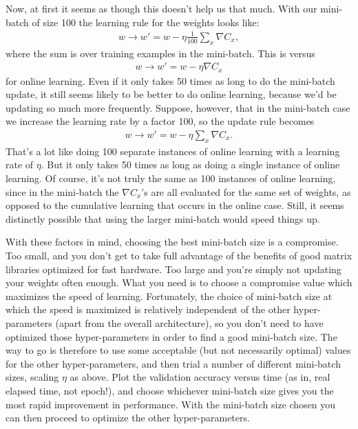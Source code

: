 \documentclass[a4paper,twoside,10pt]{book}
\begin{document}
Now, at first it seems as though this doesn't help us that much. With our mini-batch of size 100 the learning rule for the weights looks like:
\begin{eqnarray}
w \to w' = w-\eta \frac{1}{100} \sum_x \nabla C_x,
\label{eq:100}\end{eqnarray}
where the sum is over training examples in the mini-batch. This is versus
\begin{eqnarray}
w \to w' = w-\eta \nabla C_x
\label{eq:101}\end{eqnarray}
for online learning. Even if it only takes 50 times as long to do the mini-batch update, it still seems likely to be better to do online learning, because we'd be updating so much more frequently. Suppose, however, that in the mini-batch case we increase the learning rate by a factor 100, so the update rule becomes
\begin{eqnarray}
w \rightarrow w' = w-\eta \sum_x \nabla C_x.
\label{eq:102}\end{eqnarray}
That's a lot like doing 100 separate instances of online learning with a learning rate of $\eta$. But it only takes 50 times as long as doing a single instance of online learning. Of course, it's not truly the same as 100 instances of online learning, since in the mini-batch the $\nabla C_x$'s are all evaluated for the same set of weights, as opposed to the cumulative learning that occurs in the online case. Still, it seems distinctly possible that using the larger mini-batch would speed things up.

With these factors in mind, choosing the best mini-batch size is a compromise. Too small, and you don't get to take full advantage of the benefits of good matrix libraries optimized for fast hardware. Too large and you're simply not updating your weights often enough. What you need is to choose a compromise value which maximizes the speed of learning. Fortunately, the choice of mini-batch size at which the speed is maximized is relatively independent of the other hyper-parameters (apart from the overall architecture), so you don't need to have optimized those hyper-parameters in order to find a good mini-batch size. The way to go is therefore to use some acceptable (but not necessarily optimal) values for the other hyper-parameters, and then trial a number of different mini-batch sizes, scaling $\eta$ as above. Plot the validation accuracy versus time (as in, real elapsed time, not epoch!), and choose whichever mini-batch size gives you the most rapid improvement in performance. With the mini-batch size chosen you can then proceed to optimize the other hyper-parameters.
\end{document}
